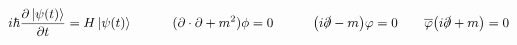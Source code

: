 \begin{gather*}
    i\hbar\pdv{\ket{\psi(t)}}{t} = H\ket{\psi(t)}
    \qquad\quad
    (\partial\cdot\partial + m^2)\phi = 0
    \qquad\quad
    \qty(i\slashed{\partial}-m)\varphi = 0
    \qquad
    \overline{\varphi}\qty(i\slashed{\partial}+m) = 0
\end{gather*}
